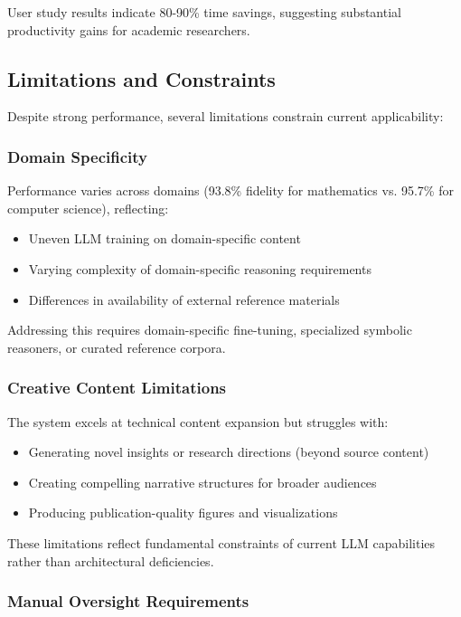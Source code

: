 \documentclass{ieeeaccess}
\begin{document}
User study results indicate 80-90\% time savings, suggesting substantial productivity gains for academic researchers.

\subsection{Limitations and Constraints}

Despite strong performance, several limitations constrain current applicability:

\subsubsection{Domain Specificity}

Performance varies across domains (93.8\% fidelity for mathematics vs. 95.7\% for computer science), reflecting:
\begin{itemize}
\item Uneven LLM training on domain-specific content
\item Varying complexity of domain-specific reasoning requirements
\item Differences in availability of external reference materials
\end{itemize}

Addressing this requires domain-specific fine-tuning, specialized symbolic reasoners, or curated reference corpora.

\subsubsection{Creative Content Limitations}

The system excels at technical content expansion but struggles with:
\begin{itemize}
\item Generating novel insights or research directions (beyond source content)
\item Creating compelling narrative structures for broader audiences
\item Producing publication-quality figures and visualizations
\end{itemize}

These limitations reflect fundamental constraints of current LLM capabilities rather than architectural deficiencies.

\subsubsection{Manual Oversight Requirements}
\end{document}
